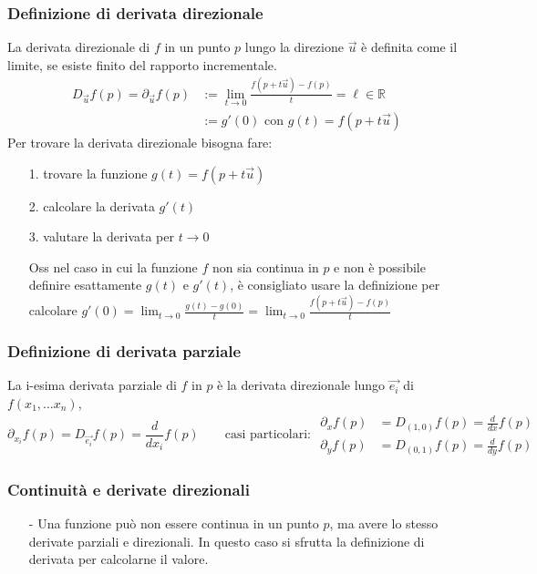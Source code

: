 \documentclass[a4paper]{article}
\newcommand\R{\mathbb{R}}     %
\newcommand\dx{\frac{d}{dx}}  %
\newcommand\dy{\frac{d}{dy}}  %
\begin{document}
\subsubsection*{Definizione di derivata direzionale}
La derivata direzionale di \(f\) in un punto \(p\) lungo la direzione \(\vec{u}\) è definita come il limite, se esiste finito
del rapporto incrementale.
\begin{align*}
	D_{\vec{u}} f(p) = \partial_{\vec{u}} f(p) &:= \lim_{t \to 0} \frac{f(p + t \vec{u}) - f(p)}{t} = \ell \in \R \\
	&:= g'(0) \text{ con } g(t) = f(p + t\vec{u})
\end{align*}
Per trovare la derivata direzionale bisogna fare:
\begin{itemize}[topsep=3pt, itemsep=0pt]
	\item[1.] trovare la funzione \(g(t) = f(p+t\vec{u})\)
	\item[2.] calcolare la derivata \(g'(t)\)
	\item[3.] valutare la derivata per \(t \to 0\)
	\item[Oss] nel caso in cui la funzione \(f\) non sia continua in \(p\) e non è possibile definire esattamente \(g(t)\) e \(g'(t)\),
	è consigliato usare la definizione per calcolare \(\displaystyle g'(0) = \lim_{t \to 0} \frac{g(t) - g(0)}{t} = \lim_{t \to 0} \frac{f(p + t \vec{u}) - f(p)}{t}\)
\end{itemize}

\subsubsection*{Definizione di derivata parziale}
La i-esima derivata parziale di \(f\) in \(p\) è la derivata direzionale lungo \(\vec{e_i}\) di \(f(x_1, \dots x_n)\),
\[\partial_{x_i} f(p) = D_{\vec{e_i}} f(p) = \frac{d}{d x_i} f(p) \qquad \text{casi particolari: } \begin{aligned}
	\partial_x f(p) &= D_{(1,0)} f(p) = \dx f(p) \\
	\partial_y f(p) &= D_{(0,1)} f(p) = \dy f(p)
\end{aligned}\]

\subsubsection*{Continuità e derivate direzionali}
\begin{itemize}[topsep=3pt, itemsep=0pt]
	\item[-] Una funzione può non essere continua in un punto \(p\), ma avere lo stesso derivate parziali e direzionali. In questo
	caso si sfrutta la definizione di derivata per calcolarne il valore.
\end{itemize}
\end{document}
